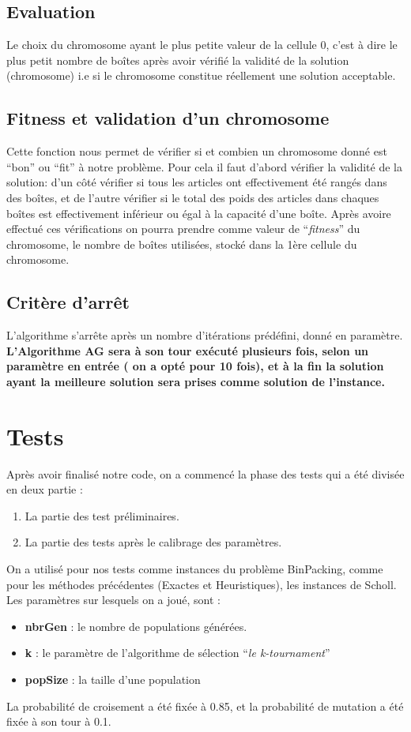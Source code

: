 \documentclass{article}
\begin{document}
\subsection{Evaluation}
Le choix du chromosome ayant le plus petite valeur de la cellule 0, c’est à dire le plus petit nombre de  boîtes après avoir vérifié la validité de la solution (chromosome) i.e si le chromosome constitue réellement une solution acceptable.
\subsection{Fitness et validation d’un chromosome}
Cette fonction nous permet de vérifier si et combien un chromosome donné est “bon” ou “fit” à notre problème. 
\newline
Pour cela il faut d’abord vérifier la validité de la solution: d’un côté vérifier si tous les articles ont effectivement été rangés dans des boîtes, et de l’autre vérifier si le total des poids des articles dans chaques boîtes est effectivement inférieur ou égal à la capacité d’une boîte. 
\newline
Après avoire effectué ces vérifications on pourra prendre comme valeur de “\textit{fitness}” du chromosome, le nombre de boîtes utilisées, stocké dans la 1ère cellule du chromosome.
\subsection{Critère d'arrêt}
L'algorithme s’arrête après un nombre d’itérations prédéfini, donné en paramètre.
\newline
\newline
\textbf{L’Algorithme AG sera à son tour exécuté plusieurs fois, selon un paramètre en entrée  ( on a opté pour 10 fois), et à la fin la solution ayant la meilleure solution sera prises comme solution de l’instance.}
\section{Tests}
Après avoir finalisé notre code, on a commencé la phase des tests qui a été divisée en deux partie :
\begin{enumerate}
	\item La partie des test préliminaires.
	\item La partie des tests après le calibrage des paramètres. 
\end{enumerate}
On a utilisé pour nos tests comme instances du problème BinPacking, comme pour les méthodes précédentes (Exactes et Heuristiques), les instances de Scholl.
Les paramètres sur lesquels on a joué, sont :
\begin{itemize}
	\item \textbf{nbrGen} : le nombre de populations générées.
	\item\textbf{ k} : le paramètre de l’algorithme de sélection “\textit{le k-tournament}”
	\item \textbf{popSize} : la taille d’une population
\end{itemize}
La probabilité de croisement a été fixée  à 0.85, et la probabilité de mutation  a été fixée à son tour à 0.1.
\end{document}
